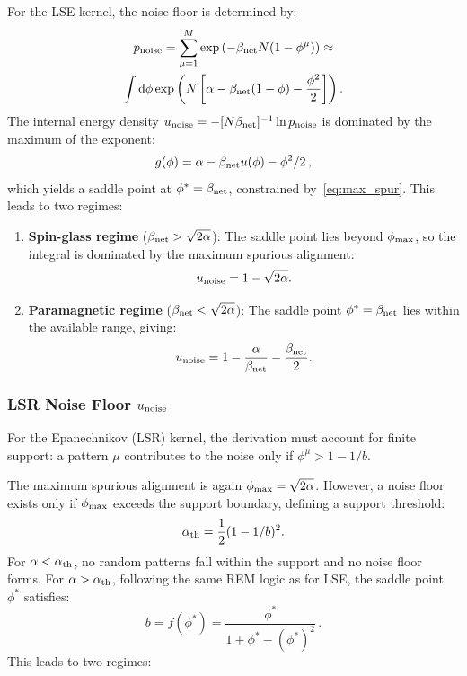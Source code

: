 \documentclass{article}
\newcommand{\dd}{{\mathrm{d}}}
\theoremstyle{plain}
\theoremstyle{definition}
\theoremstyle{remark}
\begin{document}
For the LSE kernel, the noise floor is determined by:
\begin{multline}
    p_{\rm noise} = \sum_{\mu=1}^{M} \exp\left( -\beta_{\rm net} N (1 - \phi^\mu) \right) \approx \\
    \int \dd\phi \exp\left( N \left[ \alpha - \beta_{\rm net}(1 - \phi) - \frac{\phi^2}{2} \right] \right).
\end{multline}
The internal energy density $u_{\rm noise} = -[N\beta_{\rm net}]^{-1} \ln p_{\rm noise}$ is dominated by the maximum of the exponent:
\begin{equation}
    g(\phi) = \alpha - \beta_{\rm net} u(\phi) - \phi^2/2\,,
    \label{eq:g_phi}
\end{equation}
which yields a saddle point at $\phi^* = \beta_{\rm net}$, constrained by~\eqref{eq:max_spur}. This leads to two regimes:

\begin{enumerate}
    \item \textbf{Spin-glass regime} ($\beta_{\rm net} > \sqrt{2\alpha}$): The saddle point lies beyond $\phi_{\rm max}$, so the integral is dominated by the maximum spurious alignment:
    \begin{equation}
        u_{\rm noise} = 1 - \sqrt{2\alpha}.
    \end{equation}
    
    \item \textbf{Paramagnetic regime} ($\beta_{\rm net} < \sqrt{2\alpha}$): The saddle point $\phi^* = \beta_{\rm net}$ lies within the available range, giving:
    \begin{equation}
        u_{\rm noise} = 1 - \frac{\alpha}{\beta_{\rm net}} - \frac{\beta_{\rm net}}{2}.
    \end{equation}
\end{enumerate}


\subsubsection{LSR Noise Floor $u_{\rm noise}$}

For the Epanechnikov (LSR) kernel, the derivation must account for finite support: a pattern $\mu$ contributes to the noise only if $\phi^\mu > 1 - 1/b$.

The maximum spurious alignment is again $\phi_{\rm max} = \sqrt{2\alpha}$. However, a noise floor exists only if $\phi_{\rm max}$ exceeds the support boundary, defining a support threshold:
\begin{equation}
    \alpha_{\rm th} = \frac{1}{2} (1 - 1/b)^2 .
    \label{eq:alpha_th}
\end{equation}
For $\alpha < \alpha_{\rm th}$, no random patterns fall within the support and no noise floor forms. For $\alpha > \alpha_{\rm th}$, following the same REM logic as for LSE, the saddle point $\phi^*$ satisfies:
\begin{equation}
    b = f(\phi^*) = \frac{\phi^*}{1 + \phi^* - (\phi^*)^2}\,.
\end{equation}
This leads to two regimes:
\end{document}
